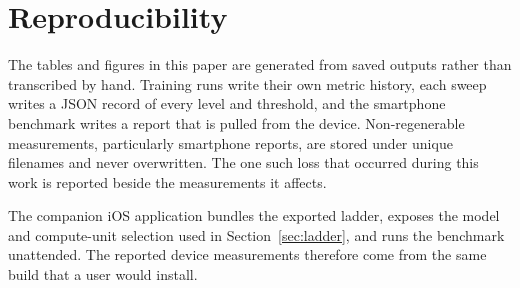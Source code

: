 \section{Reproducibility}
\label{sec:artefact}

The tables and figures in this paper are generated from saved outputs rather
than transcribed by hand. Training runs write their own metric history, each
sweep writes a JSON record of every level and threshold, and the smartphone
benchmark writes a report that is pulled from the device. Non-regenerable
measurements, particularly smartphone reports, are stored under unique
filenames and never overwritten. The one such loss that occurred during this
work is reported beside the measurements it affects.

The companion iOS application bundles the exported ladder, exposes the model
and compute-unit selection used in Section~\ref{sec:ladder}, and runs the
benchmark unattended. The reported device measurements therefore come from the
same build that a user would install.

